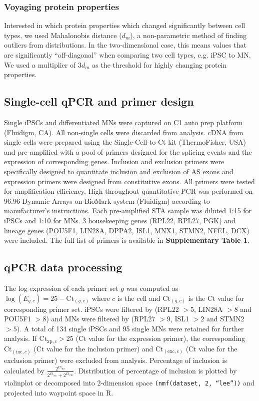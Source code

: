 \subsubsection{Voyaging protein properties}

Interested in which protein properties which changed significantly between cell types, we used Mahalonobis distance\cite{DeMaesschalck:2000hv} ($d_m$), a non-parametric method of finding outliers from distributions. In the two-dimensional case, this means values that are significantly ``off-diagonal'' when comparing two cell types, e.g. iPSC to MN. We used a multiplier of $3d_m$ as the threshold for highly changing protein properties.

\subsection{Single-cell qPCR and primer design}

Single iPSCs and differentiated MNs were captured on C1 auto prep platform (Fluidigm, CA). All non-single cells were discarded from analysis. cDNA from single cells were prepared using the Single-Cell-to-Ct kit (ThermoFisher, USA) and pre-amplified with a pool of primers designed for the splicing events and the expression of corresponding genes. Inclusion and exclusion primers were specifically designed to quantitate inclusion and exclusion of AS exons and expression primers were designed from constitutive exons. All primers were tested for amplification efficiency. High-throughout quantitative PCR was performed on 96.96 Dynamic Arrays on BioMark system (Fluidigm) according to manufacturer’s instructions. Each pre-amplified STA sample was diluted 1:15 for iPSCs and 1:10 for MNs. 3 housekeeping genes (RPL22, RPL27, PGK) and lineage genes (POU5F1, LIN28A, DPPA2, ISL1, MNX1, STMN2, NFEL, DCX) were included. The full list of primers is available in \textbf{Supplementary Table 1}.

\subsection{qPCR data processing}

The log expression of each primer set $g$ was computed as $\log(E_{g,c}) = 25 - \mathrm{Ct}_{(g,c)}$ where $c$ is the cell and $\mathrm{Ct}_{(g,c)}$ is the $\mathrm{Ct}$ value for corresponding primer set. iPSCs were filtered by (RPL22 $>5$, LIN28A $> 8$ and POU5F1 $> 8$) and MNs were filtered by (RPL27 $> 9$, ISL1 $> 2$ and STMN2 $> 5$). A total of 134 single iPSCs and 95 single MNs were retained for further analysis. If $\mathrm{Ct}_{\mathrm{xp},c}  > 25$ ($\mathrm{Ct}$ value for the expression primer), the corresponding $\mathrm{Ct}_{(\mathrm{inc},c)}$ ($\mathrm{Ct}$ value for the inclusion primer) and $\mathrm{Ct}_{(\mathrm{exc},c)}$ ($\mathrm{Ct}$ value for the exclusion primer) were excluded from analysis. Percentage of inclusion is calculated by $\frac{2^{\mathrm{Ct}_{\mathrm{inc}}}}{2^{\mathrm{Ct}_{\mathrm{inc}}} +2^{\mathrm{Ct}_{\mathrm{exc}}}}$. Distribution of percentage of inclusion is plotted by violinplot or decomposed into 2-dimension space \texttt{(nmf(dataset, 2, ``lee''))} and projected into waypoint space in R.

